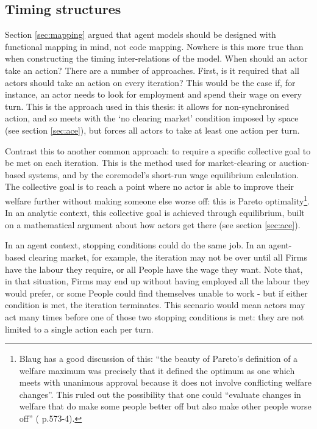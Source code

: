 {\subsection{Timing structures \label{sec:timingstr}}

Section \ref{sec:mapping} argued that agent models should be designed with functional mapping in mind, not code mapping. Nowhere is this more true than when constructing the timing inter-relations of the model. When should an actor take an action? There are a number of approaches. First, is it required that all actors should take an action on every iteration? This would be the case if, for instance, an actor needs to look for employment and spend their wage on every turn. This is the approach used in this thesis: it allows for non-synchronised action, and so meets with the `no clearing market' condition imposed by space (see section \ref{sec:ace}), but forces all actors to take at least one action per turn. 

Contrast this to another common approach: to require a specific collective goal to be met on each iteration. This is the method used for market-clearing or auction-based systems, and by the \gls{coremodel}'s short-run wage equilibrium calculation. The collective goal is to reach a point where no actor is able to improve their welfare further without making someone else worse off: this is Pareto optimality\footnote{Blaug has a good discussion of this: ``the beauty of Pareto's definition of a welfare maximum was precisely that it defined the optimum as one which meets with unanimous approval because it does not involve conflicting welfare changes''. This ruled out the possibility that one could ``evaluate changes in welfare that do make some people better off but also make other people worse off'' (\citealt{blaug_economic_1997} p.573-4).}. In an analytic context, this collective goal is achieved through equilibrium, built on a mathematical argument about how actors get there (see section \ref{sec:ace}).

In an agent context, stopping conditions could do the same job. In an agent-based clearing market, for example, the iteration may not be over until all Firms have the labour they require, or all People have the wage they want. Note that, in that situation, Firms may end up without having employed all the labour they would prefer, or some People could find themselves unable to work - but if either condition is met, the iteration terminates. This scenario would mean actors may act many times before one of those two stopping conditions is met: they are not limited to a single action each per turn.

}
